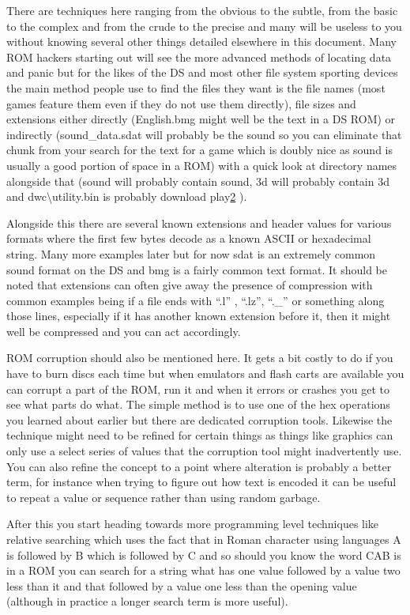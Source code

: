 \documentclass[
]{book}
\begin{document}
There are techniques here ranging from the obvious to the subtle, from the basic to the complex and from the crude to the precise and many will be useless to you without knowing several other things detailed elsewhere in this document. Many ROM hackers starting out will see the more advanced methods of locating data and panic but for the likes of the DS and most other file system sporting devices the main method people use to find the files they want is the file names (most games feature them even if they do not use them directly), file sizes and extensions either directly (English.bmg might well be the text in a DS ROM) or indirectly (sound\_data.sdat will probably be the sound so you can eliminate that chunk from your search for the text for a game which is doubly nice as sound is usually a good portion of space in a ROM) with a quick look at directory names alongside that (sound will probably contain sound, 3d will probably contain 3d and dwc\textbackslash utility.bin is probably download play\href{romhacking20203.html\#fn2x0}{2} ).

Alongside this there are several known extensions and header values for various formats where the first few bytes decode as a known ASCII or hexadecimal string. Many more examples later but for now sdat is an extremely common sound format on the DS and bmg is a fairly common text format. It should be noted that extensions can often give away the presence of compression with common examples being if a file ends with ``.l'' , ``.lz'', ``.\_'' or something along those lines, especially if it has another known extension before it, then it might well be compressed and you can act accordingly.

ROM corruption should also be mentioned here. It gets a bit costly to do if you have to burn discs each time but when emulators and flash carts are available you can corrupt a part of the ROM, run it and when it errors or crashes you get to see what parts do what. The simple method is to use one of the hex operations you learned about earlier but there are dedicated corruption tools. Likewise the technique might need to be refined for certain things as things like graphics can only use a select series of values that the corruption tool might inadvertently use. You can also refine the concept to a point where alteration is probably a better term, for instance when trying to figure out how text is encoded it can be useful to repeat a value or sequence rather than using random garbage.

After this you start heading towards more programming level techniques like relative searching which uses the fact that in Roman character using languages A is followed by B which is followed by C and so should you know the word CAB is in a ROM you can search for a string what has one value followed by a value two less than it and that followed by a value one less than the opening value (although in practice a longer search term is more useful).
\end{document}
